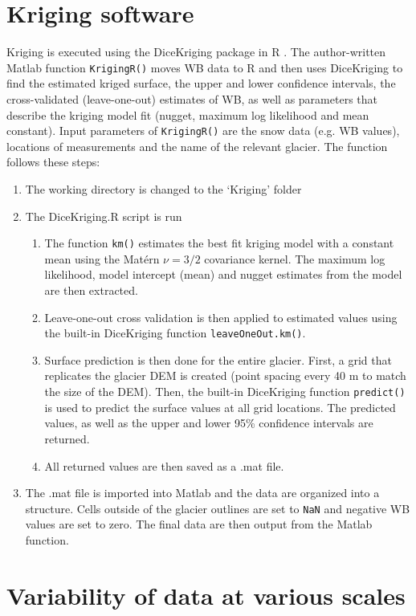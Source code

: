 \documentclass{sfuthesis}
\begin{document}
\begin{appendices}
\chapter{Kriging software}
\label{app:KrigingMethods}
Kriging is executed using the DiceKriging package in R \citep{Roustant2012}. The author-written Matlab function \texttt{KrigingR()} moves WB data to R and then uses DiceKriging to find the estimated kriged surface, the upper and lower confidence intervals, the cross-validated (leave-one-out) estimates of WB, as well as parameters that describe the kriging model fit (nugget, maximum log likelihood and mean constant). Input parameters of  \texttt{KrigingR()} are the snow data (e.g. WB values), locations of measurements and the name of the relevant glacier. The function follows these steps:
\begin{enumerate}
\item The working directory is changed to the `Kriging' folder
\item The DiceKriging.R script is run
	\begin{enumerate}
	\item The function \texttt{km()} estimates the best fit kriging model with a constant mean using the Mat\'ern $\nu = 3/2$ covariance kernel. The maximum log likelihood, model intercept (mean) and nugget estimates from the model are then extracted. 
	\item Leave-one-out cross validation is then applied to estimated values using the built-in DiceKriging function \texttt{leaveOneOut.km()}.
	\item Surface prediction is then done for the entire glacier. First, a grid that replicates the glacier DEM is created (point spacing every 40 m to match the size of the DEM). Then, the built-in DiceKriging function \texttt{predict()} is used to predict the surface values at all grid locations. The predicted values, as well as the upper and lower 95\% confidence intervals are returned. 
	\item All returned values are then saved as a .mat file.
	\end{enumerate}
\item The .mat file is imported into Matlab and the data are organized into a structure. Cells outside of the glacier outlines are set to \texttt{NaN} and negative WB values are set to zero. The final data are then output from the Matlab function. 
\end{enumerate}

\chapter{Variability of data at various scales}


\end{appendices}
\end{document}
